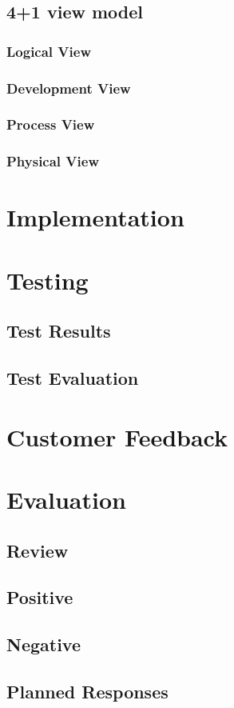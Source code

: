 \subsection{4+1 view model}
\subsubsection{Logical View}
\subsubsection{Development View}
\subsubsection{Process View}
\subsubsection{Physical View}

\section{Implementation}
\section{Testing}
\subsection{Test Results}
\subsection{Test Evaluation}
\section{Customer Feedback}
\section{Evaluation}
\subsection{Review}
\subsection{Positive}
\subsection{Negative}
\subsection{Planned Responses}
